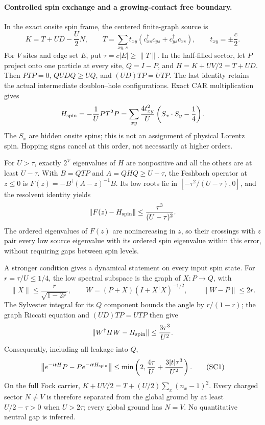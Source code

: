 \paragraph{Controlled spin exchange and a growing-contact free boundary.}
In the exact onsite spin frame, the centered finite-graph source is
\[
 K=T+UD-\frac U2N,\qquad
 T=\sum_{xy,s}t_{xy}(c_{xs}^{\dagger}c_{ys}+c_{ys}^{\dagger}c_{xs}),
 \qquad t_{xy}=\pm\frac c2.
\]
For $V$ sites and edge set $E$, put $\tau=c|E|\geq\|T\|$.
In the half-filled sector, let $P$ project onto one particle at every
site, $Q=I-P$, and $H=K+UV/2=T+UD$. Then $PTP=0$, $QUDQ\geq UQ$,
and $(UD)TP=UTP$. The last identity retains the actual intermediate
doublon--hole configurations. Exact CAR multiplication gives
\[
 H_{\rm spin}=-\frac1U PT^2P
  =\sum_{xy}\frac{4t_{xy}^2}{U}
           \left(S_x\mathbin{\cdot}S_y-\frac14\right).
\]
The $S_x$ are hidden onsite spins; this is not an assignment of physical
Lorentz spin. Hopping signs cancel at this order, not necessarily at
higher orders.

For $U>\tau$, exactly $2^V$ eigenvalues of $H$ are nonpositive and
all the others are at least $U-\tau$. With $B=QTP$ and
$A=QHQ\geq U-\tau$, the Feshbach operator at $z\leq0$ is
$F(z)=-B^{\dagger}(A-z)^{-1}B$. Its low roots lie in
$[-\tau^2/(U-\tau),0]$, and the resolvent identity yields
\[
 \|F(z)-H_{\rm spin}\|\leq\frac{\tau^3}{(U-\tau)^2}.
\]
The ordered eigenvalues of $F(z)$ are nonincreasing in $z$, so their
crossings with $z$ pair every low source eigenvalue with its ordered
spin eigenvalue within this error, without requiring gaps between
spin levels.

A stronger condition gives a dynamical statement on every input spin
state. For $r=\tau/U\leq1/4$, the low spectral subspace is the graph
of $X:P\to Q$, with
\[
 \|X\|\leq\frac r{\sqrt{1-2r}},\qquad
 W=(P+X)(I+X^{\dagger}X)^{-1/2},\qquad \|W-P\|\leq2r.
\]
The Sylvester integral for its $Q$ component bounds the angle by
$r/(1-r)$; the graph Riccati equation and $(UD)TP=UTP$ then give
\[
 \|W^{\dagger}HW-H_{\rm spin}\|\leq\frac{3\tau^3}{U^2}.
\]
Consequently, including all leakage into $Q$,
\[
 \big\|e^{-itH}P-Pe^{-itH_{\rm spin}}\big\|
 \leq\min\left(2,\frac{4\tau}{U}
                   +\frac{3|t|\tau^3}{U^2}\right).       \tag{SC1}
\]
On the full Fock carrier,
$K+UV/2=T+(U/2)\sum_x(n_x-1)^2$.
Every charged sector $N\ne V$ is therefore separated from the global
ground by at least $U/2-\tau>0$ when $U>2\tau$; every global ground
has $N=V$. No quantitative neutral gap is inferred.

